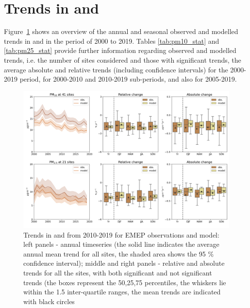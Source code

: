 \section{\label{sec:Trends_PM }Trends in \PM[10] and \PM[2.5] }

Figure~\ref{fig:pm_trends} shows an overview of the annual and seasonal observed and modelled trends in \PM[10] and \PM[2.5] in the period of 2000 to 2019. Tables \ref{tab:pm10_stat} and \ref{tab:pm25_stat} provide further information regarding observed and modelled trends, i.e. the number of sites considered and those with significant trends, the average absolute and relative trends (including confidence intervals) for the 2000-2019 period, for 2000-2010 and 2010-2019 sub-periods, and also for 2005-2019.


\begin{figure}
	\centering
	\includegraphics[width=0.74\paperwidth]{FIGS_TRENDS/PM_trends.png}
	\caption{\label{fig:pm_trends}Trends in \PM[10]  and \PM[2.5] from 2010-2019 for EMEP observations and model: left panels - annual timeseries (the solid line indicates the average annual mean trend for all sites, the shaded area shows the 95 \% confidence interval); middle and right panels - relative and absolute trends for all the sites, with both significant and not significant trends (the boxes represent the 50,25,75 percentiles, the whiskers lie within the 1.5 inter-quartile ranges, the mean trends are indicated with black circles}
\end{figure}



